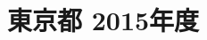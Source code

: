 \documentclass[../../hsm_tok_q.tex]{subfiles}
\begin{document}
    \section{東京都 2015年度}
    \subsection{　}
    
    \newpage
    \subsection{　}
    
    \newpage
    \subsection{　}
    
    \newpage
    \subsection{　}
    
    \newpage
    \subsection{　}
    
\end{document}
